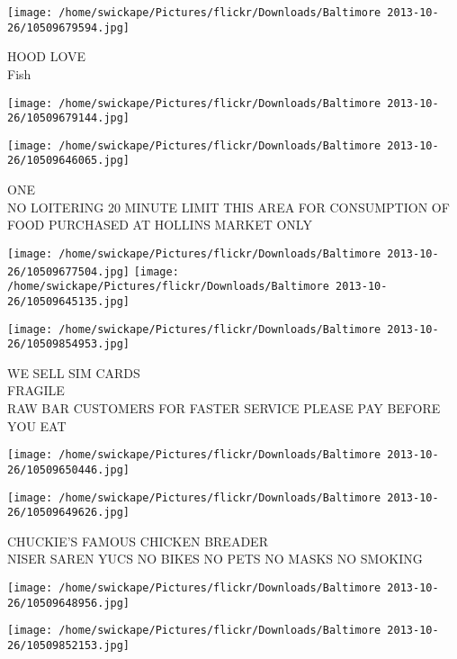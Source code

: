 \documentclass[10pt,letterpaper]{article}
\begin{document}
\vspace{0.25in}
\texttt{[image: /home/swickape/Pictures/flickr/Downloads/Baltimore 2013-10-26/10509679594.jpg]}

HOOD LOVE\\
Fish\\
\pagebreak

\texttt{[image: /home/swickape/Pictures/flickr/Downloads/Baltimore 2013-10-26/10509679144.jpg]}

\vspace{0.25in}
\texttt{[image: /home/swickape/Pictures/flickr/Downloads/Baltimore 2013-10-26/10509646065.jpg]}

ONE\\
NO LOITERING 20 MINUTE LIMIT THIS AREA FOR CONSUMPTION OF FOOD PURCHASED AT HOLLINS MARKET ONLY\\
\pagebreak

\texttt{[image: /home/swickape/Pictures/flickr/Downloads/Baltimore 2013-10-26/10509677504.jpg]}
\texttt{[image: /home/swickape/Pictures/flickr/Downloads/Baltimore 2013-10-26/10509645135.jpg]}

\vspace{0.25in}
\texttt{[image: /home/swickape/Pictures/flickr/Downloads/Baltimore 2013-10-26/10509854953.jpg]}

WE SELL SIM CARDS\\
FRAGILE\\
RAW BAR CUSTOMERS FOR FASTER SERVICE PLEASE PAY BEFORE YOU EAT\\
\pagebreak

\texttt{[image: /home/swickape/Pictures/flickr/Downloads/Baltimore 2013-10-26/10509650446.jpg]}

\vspace{0.25in}
\texttt{[image: /home/swickape/Pictures/flickr/Downloads/Baltimore 2013-10-26/10509649626.jpg]}

CHUCKIE'S FAMOUS CHICKEN BREADER\\
NISER SAREN YUCS NO BIKES NO PETS NO MASKS NO SMOKING\\
\pagebreak

\texttt{[image: /home/swickape/Pictures/flickr/Downloads/Baltimore 2013-10-26/10509648956.jpg]}

\vspace{0.25in}
\texttt{[image: /home/swickape/Pictures/flickr/Downloads/Baltimore 2013-10-26/10509852153.jpg]}
\end{document}
